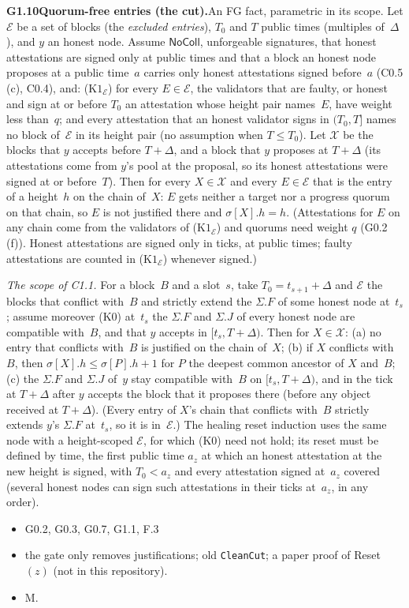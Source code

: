 \documentclass{article}
\newcommand{\dagnode}[6]{%
\par\medskip\noindent\textbf{#1\enspace #2.}\enspace #3
\begin{itemize}[leftmargin=2.2em,itemsep=0pt,topsep=2pt]
\item[\emph{Uses}] #4
\item[\emph{Evid.}] #5
\item[\emph{Task}] #6
\end{itemize}}
\begin{document}
\dagnode{G1.10}{Quorum-free entries (the cut)}{An FG fact, parametric in
its scope.  Let $\mathcal E$ be a set of blocks (the \emph{excluded entries}),
$T_0$ and $T$ public times (multiples of~$\Delta$), and $y$ an honest node.
Assume $\mathsf{NoColl}$, unforgeable signatures, that honest attestations are
signed only at public times and that a block an honest node proposes at a
public time~$a$ carries only honest attestations signed before~$a$ (C0.5 (c), C0.4),
and:
($\mathrm K1_{\mathcal E}$) for every $E\in\mathcal E$, the validators that are
faulty, or honest and sign at or before $T_0$ an attestation whose height pair
names~$E$, have weight less than~$q$; and every attestation that an honest
validator signs in $(T_0,T]$ names no block of~$\mathcal E$ in its height pair
(no assumption when $T\leq T_0$).
Let $\mathcal X$ be the blocks that $y$ accepts before $T+\Delta$, and a block
that $y$ proposes at $T+\Delta$ (its attestations come from $y$'s pool at the
proposal, so its honest attestations were signed at or before~$T$).  Then for every
$X\in\mathcal X$ and every $E\in\mathcal E$ that is the entry of a height~$h$ on
the chain of~$X$: $E$ gets neither a target nor a progress quorum on that chain,
so $E$ is not justified there and $\sigma[X].h=h$.  (Attestations for $E$ on any chain
come from the validators of ($\mathrm K1_{\mathcal E}$) and quorums need weight
$q$ (G0.2 (f)).  Honest attestations are signed only in ticks, at public times;
faulty attestations are counted in ($\mathrm K1_{\mathcal E}$) whenever signed.)

\emph{The scope of C1.1.}  For a block~$B$ and a slot~$s$, take $T_0=t_{s+1}+\Delta$
and $\mathcal E$ the blocks that conflict with~$B$ and strictly extend the
$\Sigma.F$ of some honest node at~$t_s$; assume moreover (K0) at~$t_s$ the
$\Sigma.F$ and $\Sigma.J$ of every honest node are compatible with~$B$, and that
$y$ accepts in $[t_s,T+\Delta)$.  Then for $X\in\mathcal X$: (a) no entry that
conflicts with~$B$ is justified on the chain of~$X$; (b) if $X$ conflicts
with~$B$, then $\sigma[X].h\leq\sigma[P].h+1$ for $P$ the deepest common ancestor
of $X$ and~$B$; (c) the $\Sigma.F$ and $\Sigma.J$ of~$y$ stay compatible with~$B$
on $[t_s,T+\Delta)$, and in the tick at $T+\Delta$ after $y$ accepts the block
that it proposes there (before any object received at $T+\Delta$).  (Every
entry of $X$'s chain that conflicts with~$B$ strictly extends $y$'s $\Sigma.F$
at~$t_s$, so it is in~$\mathcal E$.)  The healing reset induction uses the same
node with a height-scoped $\mathcal E$, for which (K0) need not hold; its reset
must be defined by time, the first public time $a_z$ at which an honest attestation at
the new height is signed, with $T_0<a_z$ and every attestation signed at~$a_z$ covered
(several honest nodes can sign such attestations in their ticks at~$a_z$, in any order).}
{G0.2, G0.3, G0.7, G1.1, F.3}{the gate only removes justifications;
old \texttt{CleanCut}; a paper proof of \textsf{Reset}$(z)$ (not in this
repository).}{M.}
\end{document}
